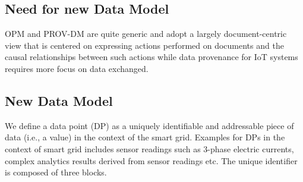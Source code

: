 \subsection{Need for new Data Model}
OPM and PROV-DM are quite generic and adopt a largely document-centric view that is centered on expressing actions performed on documents and the causal relationships between such actions while data provenance for IoT systems requires more focus on data exchanged.

\subsection{New Data Model}

We define a data point (DP) as a uniquely identifiable and addressable piece of data (i.e., a value) in the context of the smart grid. Examples for DPs in the context of smart grid includes sensor readings such as 3-phase electric currents, complex analytics results derived from sensor readings etc. The unique identifier is composed of three blocks.
